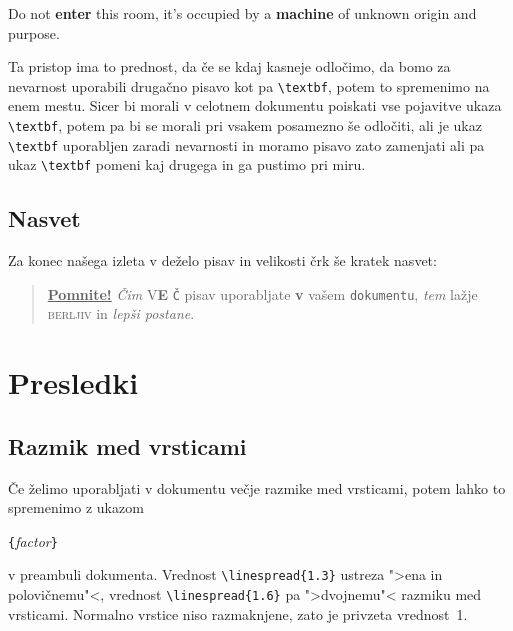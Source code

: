 \begin{example}
\newcommand{\oops}[1]{\textbf{#1}}
Do not \oops{enter} this room,
it's occupied by a \oops{machine}
of unknown origin and purpose.
\end{example}

Ta pristop ima to prednost, da če se kdaj kasneje odločimo, da bomo za nevarnost uporabili 
drugačno pisavo kot pa \verb|\textbf|, potem to spremenimo na enem mestu. Sicer bi morali 
v celotnem dokumentu poiskati vse pojavitve ukaza \verb|\textbf|, potem pa bi se morali pri vsakem posamezno 
še odločiti, ali je ukaz \verb|\textbf| uporabljen zaradi nevarnosti in moramo pisavo zato zamenjati ali pa 
ukaz \verb|\textbf| pomeni kaj drugega in ga pustimo pri miru.

\subsection{Nasvet}

Za konec našega izleta v deželo pisav in velikosti črk še kratek nasvet:\nopagebreak

\begin{quote}
  \underline{\textbf{Pomnite\Huge!}} \textit{Čim}
  \textsf{V\textbf{\LARGE E} \texttt{Č}} pisav \Huge uporabljate
  \footnotesize \textbf{v} vašem \small \texttt{dokumentu},
  \large \textit{tem} \normalsize lažje \textsc{berljiv} in
  \textsl{\textsf{lepši} pos\large t\Large a\LARGE n\huge e}.
\end{quote}

\section{Presledki}
 
\subsection{Razmik med vrsticami}

 Če želimo uporabljati v dokumentu večje razmike 
med vrsticami, 
potem lahko to spremenimo z ukazom
\begin{lscommand}
\verb|{|\emph{factor}\verb|}|
\end{lscommand}
\noindent v preambuli dokumenta.
Vrednost \verb|\linespread{1.3}| ustreza ">ena in polovičnemu"<,
vrednost \verb|\linespread{1.6}| pa ">dvojnemu"< razmiku med vrsticami. Normalno
vrstice niso razmaknjene, zato je privzeta vrednost~1.
 
